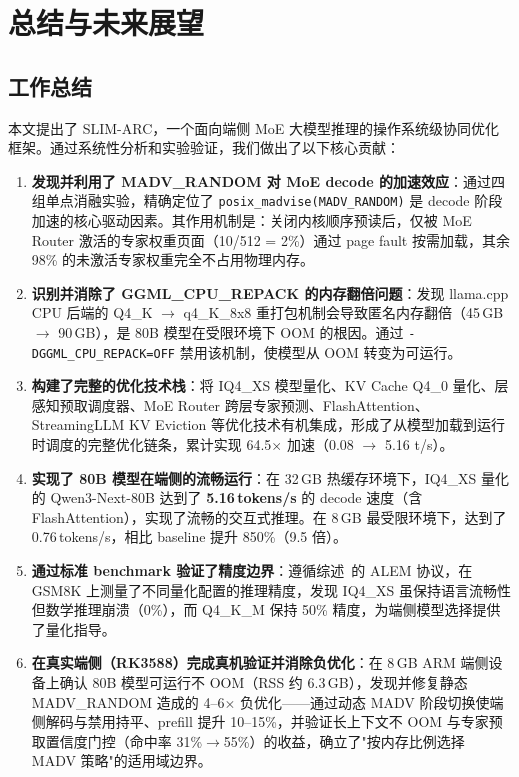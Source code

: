 \newpage
\section{总结与未来展望}

\subsection{工作总结}

本文提出了 SLIM-ARC，一个面向端侧 MoE 大模型推理的操作系统级协同优化框架。通过系统性分析和实验验证，我们做出了以下核心贡献：

\begin{enumerate}
    \item \textbf{发现并利用了 MADV\_RANDOM 对 MoE decode 的加速效应}：通过四组单点消融实验，精确定位了 \texttt{posix\_madvise(MADV\_RANDOM)} 是 decode 阶段加速的核心驱动因素。其作用机制是：关闭内核顺序预读后，仅被 MoE Router 激活的专家权重页面（10/512 = 2\%）通过 page fault 按需加载，其余 98\% 的未激活专家权重完全不占用物理内存。

    \item \textbf{识别并消除了 GGML\_CPU\_REPACK 的内存翻倍问题}：发现 llama.cpp CPU 后端的 Q4\_K $\to$ q4\_K\_8x8 重打包机制会导致匿名内存翻倍（45\,GB $\to$ 90\,GB），是 80B 模型在受限环境下 OOM 的根因。通过 \texttt{-DGGML\_CPU\_REPACK=OFF} 禁用该机制，使模型从 OOM 转变为可运行。

    \item \textbf{构建了完整的优化技术栈}：将 IQ4\_XS 模型量化、KV Cache Q4\_0 量化、层感知预取调度器、MoE Router 跨层专家预测、FlashAttention、StreamingLLM KV Eviction 等优化技术有机集成，形成了从模型加载到运行时调度的完整优化链条，累计实现 64.5$\times$ 加速（0.08 $\to$ 5.16 t/s）。

    \item \textbf{实现了 80B 模型在端侧的流畅运行}：在 32\,GB 热缓存环境下，IQ4\_XS 量化的 Qwen3-Next-80B 达到了 \textbf{5.16\,tokens/s} 的 decode 速度（含 FlashAttention），实现了流畅的交互式推理。在 8\,GB 最受限环境下，达到了 0.76\,tokens/s，相比 baseline 提升 850\%（9.5 倍）。

    \item \textbf{通过标准 benchmark 验证了精度边界}：遵循综述~\cite{survey2026}的 ALEM 协议，在 GSM8K 上测量了不同量化配置的推理精度，发现 IQ4\_XS 虽保持语言流畅性但数学推理崩溃（0\%），而 Q4\_K\_M 保持 50\% 精度，为端侧模型选择提供了量化指导。

    \item \textbf{在真实端侧（RK3588）完成真机验证并消除负优化}：在 8\,GB ARM 端侧设备上确认 80B 模型可运行不 OOM（RSS 约 6.3\,GB），发现并修复静态 MADV\_RANDOM 造成的 4--6$\times$ 负优化——通过动态 MADV 阶段切换使端侧解码与禁用持平、prefill 提升 10--15\%，并验证长上下文不 OOM 与专家预取置信度门控（命中率 31\%$\to$55\%）的收益，确立了"按内存比例选择 MADV 策略"的适用域边界。


\end{enumerate}
